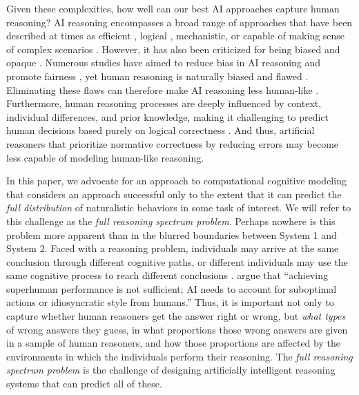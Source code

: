     Given these complexities, how well can our best AI approaches capture human reasoning? AI reasoning encompasses a broad range of approaches that have been described at times as efficient \citep{maclure_ai_2021}, logical \citep{hagedorn_knowledge_2020}, mechanistic, or capable of making sense of complex scenarios \citep{zollman_analyzing_2023}. However, it has also been criticized for being biased and opaque \citep{oneil_weapons_2017}. Numerous studies have aimed to reduce bias in AI reasoning and promote fairness \citep{ma_fairness-guided_2023}, yet human reasoning is naturally biased and flawed \citep{gilovich_heuristics_2002, ariely_predictably_2010, stanovich_rationality_2018}. Eliminating these flaws can therefore make AI reasoning less human-like \citep{chemero_llms_2023, prescott_understanding_2023}. Furthermore, human reasoning processes are deeply influenced by context, individual differences, and prior knowledge, making it challenging to predict human decisions based purely on logical correctness \citep{nisbett_telling_1977, kahneman_choices_1984, stanovich_individual_2000}. And thus, artificial reasoners that prioritize normative correctness by reducing errors \citep{sun_survey_2024} may become less capable of modeling human-like reasoning.
    

    In this paper, we advocate for an approach to computational cognitive modeling that considers an approach successful only to the extent that it can predict the \textit{full distribution} of naturalistic behaviors in some task of interest. We will refer to this challenge as the \textit{full reasoning spectrum problem}. %
    Perhaps nowhere is this problem more apparent than in the blurred boundaries between System 1 and System 2. Faced with a reasoning problem, individuals may arrive at the same conclusion through different cognitive paths, or different individuals may use the same cognitive process to reach different conclusions \citep{de_neys_logic_2019, Nye2021}. \citet{hamade2024designing} argue that ``achieving superhuman performance is not sufficient; AI needs to account for suboptimal actions or idiosyncratic style from humans.'' Thus, it is important not only to capture whether human reasoners get the answer right or wrong, but \textit{what types} of wrong answers they guess, in what proportions those wrong answers are given in a sample of human reasoners, and how those proportions are affected by the environments in which the individuals perform their reasoning. The \textit{full reasoning spectrum problem} is the challenge of designing artificially intelligent reasoning systems that can predict all of these.

